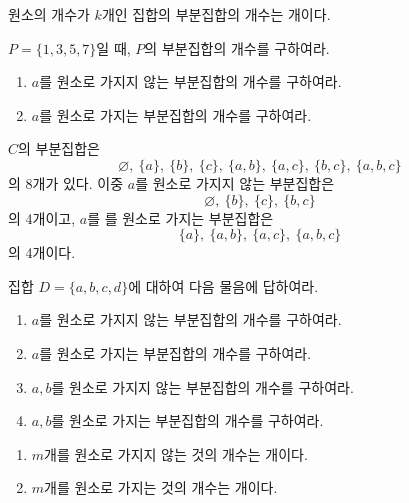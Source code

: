 \documentclass{oblivoir}
\begin{document}
%
\begin{mdframed}
\theo{}\label{ssubset4}
원소의 개수가 \(k\)개인 집합의 부분집합의 개수는 개이다.
\end{mdframed}

%
\prob{}\label{ssubset5}
\(P=\{1,3,5,7\}\)일 때, \(P\)의 부분집합의 개수를 구하여라.

\newpage
%
\begin{enumerate}\label{ssubset6}
\item
\(a\)를 원소로 가지지 않는 부분집합의 개수를 구하여라.
\item
\(a\)를 원소로 가지는 부분집합의 개수를 구하여라.
\end{enumerate}

\begin{mdframed}[skipabove=0pt]
\(C\)의 부분집합은
\[\varnothing,\:\{a\},\:\{b\},\:\{c\},\:\{a,b\},\:\{a,c\},\:\{b,c\},\:\{a,b,c\}\]
의 \(8\)개가 있다.
이중 \(a\)를 원소로 가지지 않는 부분집합은
\[\varnothing,\:\{b\},\:\{c\},\:\{b,c\}\]
의 4개이고, \(a\)를 를 원소로 가지는 부분집합은
\[\{a\},\:\{a,b\},\:\{a,c\},\:\{a,b,c\}\]
의 4개이다.
\end{mdframed}

%
\prob{}\label{ssubset7}
집합 \(D=\{a,b,c,d\}\)에 대하여 다음 물음에 답하여라.
\begin{enumerate}
\item
\(a\)를 원소로 가지지 않는 부분집합의 개수를 구하여라.
\item
\(a\)를 원소로 가지는 부분집합의 개수를 구하여라.
\item
\(a,b\)를 원소로 가지지 않는 부분집합의 개수를 구하여라.
\item
\(a,b\)를 원소로 가지는 부분집합의 개수를 구하여라.
\end{enumerate}

%
\begin{mdframed}
\begin{enumerate}\label{ssubset8}
\item
\(m\)개를 원소로 가지지 않는 것의 개수는 개이다.
\item
\(m\)개를 원소로 가지는 것의 개수는 개이다.
\end{enumerate}
\end{mdframed}


\end{document}
